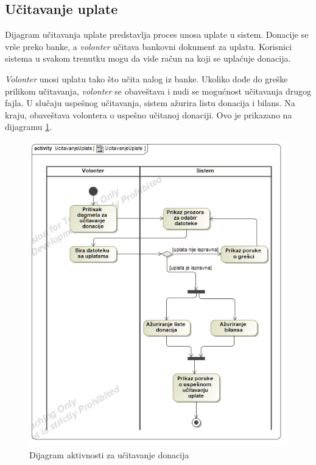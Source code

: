 \subsection{Učitavanje uplate}
\par Dijagram učitavanja uplate predstavlja proces unosa uplate u sistem. Donacije se vrše preko banke, a \textit{volonter} učitava bankovni dokument za uplatu.
Korisnici sistema u svakom trenutku mogu da vide račun na koji se uplaćuje donacija.
\par \textit{Volonter} unosi uplatu tako što učita nalog iz banke. Ukoliko dođe do greške prilikom učitavanja, \textit{volonter} se obaveštava i nudi se mogućnost
učitavanja drugog fajla. U slučaju uspešnog učitavanja, sistem ažurira listu donacija i bilans. Na kraju, obaveštava volontera o uspešno učitanoj donaciji.
Ovo je prikazano na dijagramu \ref{fig:activity-load-donation}.
\begin{figure}[ht]
    \centering
    \includegraphics[width=\textwidth, height=\textwidth]{img/load_donation.jpg}
    \caption{Dijagram aktivnosti za učitavanje donacija}
    \label{fig:activity-load-donation}
\end{figure}